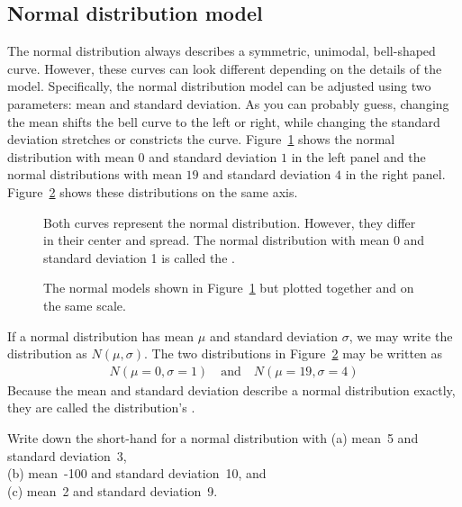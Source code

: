 \subsection{Normal distribution model}

The normal distribution always describes a symmetric, unimodal,
bell-shaped curve.
However, these curves can look different depending on the
details of the model.
Specifically, the normal distribution model can be adjusted
using two parameters: mean and standard deviation.
As you can probably guess, changing the mean shifts the bell
curve to the left or right, while changing the standard deviation
stretches or constricts the curve.
Figure~\ref{twoSampleNormals} shows the normal distribution
with mean $0$ and standard deviation $1$ in the left panel
and the normal distributions with mean $19$ and standard
deviation $4$ in the right panel.
Figure~\ref{twoSampleNormalsStacked} shows these distributions
on the same axis.

\begin{figure}[h]
  \centering
  \caption{Both curves represent the normal distribution.
      However, they differ in their center and spread.
      The normal distribution with mean 0 and standard
      deviation 1 is called the
      .}
  \label{twoSampleNormals}
\end{figure}

\begin{figure}[h]
  \centering
  \caption{The normal models shown in
      Figure~\ref{twoSampleNormals} but plotted together
      and on the same scale.}
  \label{twoSampleNormalsStacked}
\end{figure}

If a normal distribution has mean $\mu$ and standard deviation
$\sigma$, we may write the distribution as $N(\mu, \sigma)$.
The two distributions in Figure~\ref{twoSampleNormalsStacked}
may be written as
\begin{align*}
N(\mu=0,\sigma=1)
  \quad \text{and} \quad
  N(\mu=19,\sigma=4)
\end{align*}
Because the mean and standard deviation describe a normal
distribution exactly, they are called the distribution's
.

\begin{exercisewrap}
\begin{nexercise}
Write down the short-hand for a normal distribution
with\footnotemark{}
(a)
    mean~5 and standard deviation~3, \\
(b)
    mean~-100 and standard deviation~10, and \\
(c)
    mean~2 and standard deviation~9.
\end{nexercise}
\end{exercisewrap}



